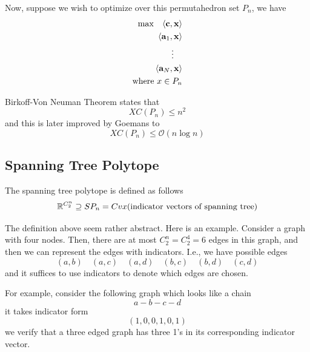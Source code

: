 Now, suppose we wish to optimize over this permutahedron set $P_n$, we have 
\begin{equation}
	\begin{aligned}
		\max \quad \langle \mathbf{c}, \mathbf{x} \rangle \\ 
		\langle \mathbf{a}_1, \mathbf{x} \rangle \\
		\vdots \quad \\
		\langle \mathbf{a}_N, \mathbf{x} \rangle \\
		\text{where } x \in P_n
	\end{aligned}
\end{equation}

\begin{proposition}
	Birkoff-Von Neuman Theorem states that 
	\begin{equation}
		XC(P_n) \leq n ^2
	\end{equation}
	and this is later improved by Goemans to 
	\begin{equation}
		XC(P_n) \leq \mathcal O (n \log n)
	\end{equation}
\end{proposition}

\subsection{Spanning Tree Polytope}
\begin{definition}
	The spanning tree polytope is defined as follows
	\begin{equation}
		\mathbb{R}^{C^n_2} \supseteq SP_n = Cvx (\text{indicator vectors of spanning tree})
	\end{equation}
\end{definition}
The definition above seem rather abstract. Here is an example. Consider a graph with four nodes. Then, there are at most $C^n_2 = C^4_2 = 6$ edges in this graph, and then we can represent the edges with indicators. I.e., we have possible edges
\begin{equation}
	(a, b) \quad (a, c) \quad (a, d) \quad (b, c) \quad (b, d) \quad (c, d)
\end{equation}
and it suffices to use indicators to denote which edges are chosen. 

For example, consider the following graph which looks like a chain
\begin{equation}
	a - b - c - d 
\end{equation}
it takes indicator form 
\begin{equation}
	(1, 0, 0, 1, 0, 1)
\end{equation}
we verify that a three edged graph has three 1's in its corresponding indicator vector. 


